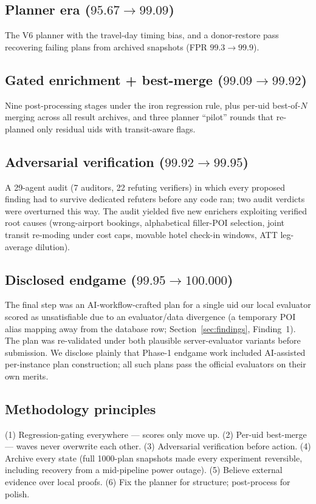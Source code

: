 \documentclass{article}
\begin{document}
\subsection{Planner era ($95.67\!\to\!99.09$)}
The V6 planner with the travel-day timing bias, and a donor-restore pass
recovering failing plans from archived snapshots (FPR $99.3\!\to\!99.9$).

\subsection{Gated enrichment + best-merge ($99.09\!\to\!99.92$)}
Nine post-processing stages under the iron regression rule, plus per-uid
best-of-$N$ merging across all result archives, and three planner ``pilot''
rounds that re-planned only residual uids with transit-aware flags.

\subsection{Adversarial verification ($99.92\!\to\!99.95$)}
A 29-agent audit (7 auditors, 22 refuting verifiers) in which every
proposed finding had to survive dedicated refuters before any code ran;
two audit verdicts were overturned this way. The audit yielded five new
enrichers exploiting verified root causes (wrong-airport bookings,
alphabetical filler-POI selection, joint transit re-moding under cost caps,
movable hotel check-in windows, ATT leg-average dilution).

\subsection{Disclosed endgame ($99.95\!\to\!100.000$)}
The final step was an AI-workflow-crafted plan for a single uid our local
evaluator scored as unsatisfiable due to an evaluator/data divergence (a
temporary POI alias mapping away from the database row; Section~\ref{sec:findings},
Finding~1). The plan was re-validated under both plausible server-evaluator
variants before submission. We disclose plainly that Phase-1 endgame work
included AI-assisted per-instance plan construction; all such plans pass
the official evaluators on their own merits.

\subsection{Methodology principles}
(1) Regression-gating everywhere --- scores only move up. (2) Per-uid
best-merge --- waves never overwrite each other. (3) Adversarial
verification before action. (4) Archive every state (full 1000-plan
snapshots made every experiment reversible, including recovery from a
mid-pipeline power outage). (5) Believe external evidence over local
proofs. (6) Fix the planner for structure; post-process for polish.
\end{document}
